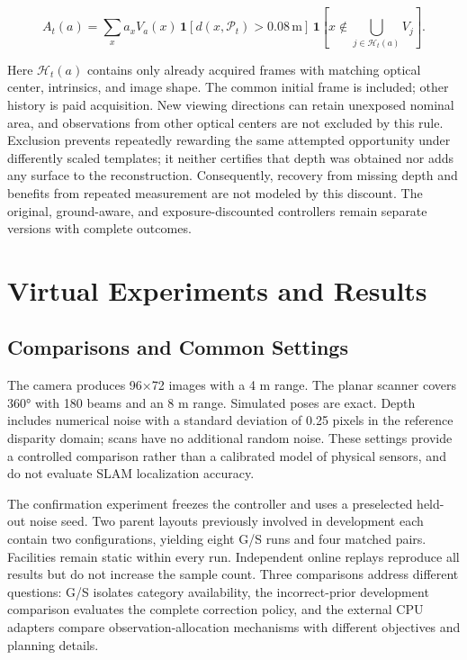 \documentclass[11pt,a4paper]{article}
\begin{document}
\[
A_t(a)=\sum_x a_x V_a(x)\,\mathbf 1[d(x,\mathcal P_t)>0.08\,\mathrm m]\,
\mathbf 1[x\notin\bigcup_{j\in\mathcal H_t(a)}V_j].
\]

Here \(\mathcal H_t(a)\) contains only already acquired frames with matching optical center, intrinsics, and image shape. The common initial frame is included; other history is paid acquisition. New viewing directions can retain unexposed nominal area, and observations from other optical centers are not excluded by this rule. Exclusion prevents repeatedly rewarding the same attempted opportunity under differently scaled templates; it neither certifies that depth was obtained nor adds any surface to the reconstruction. Consequently, recovery from missing depth and benefits from repeated measurement are not modeled by this discount. The original, ground-aware, and exposure-discounted controllers remain separate versions with complete outcomes.

\hypertarget{virtual-experiments-and-results}{%
\section{Virtual Experiments and Results}\label{virtual-experiments-and-results}}

\hypertarget{comparisons-and-common-settings}{%
\subsection{Comparisons and Common Settings}\label{comparisons-and-common-settings}}

The camera produces 96×72 images with a 4 m range. The planar scanner covers 360° with 180 beams and an 8 m range. Simulated poses are exact. Depth includes numerical noise with a standard deviation of 0.25 pixels in the reference disparity domain; scans have no additional random noise. These settings provide a controlled comparison rather than a calibrated model of physical sensors, and do not evaluate SLAM localization accuracy.

The confirmation experiment freezes the controller and uses a preselected held-out noise seed. Two parent layouts previously involved in development each contain two configurations, yielding eight G/S runs and four matched pairs. Facilities remain static within every run. Independent online replays reproduce all results but do not increase the sample count. Three comparisons address different questions: G/S isolates category availability, the incorrect-prior development comparison evaluates the complete correction policy, and the external CPU adapters compare observation-allocation mechanisms with different objectives and planning details.
\end{document}
